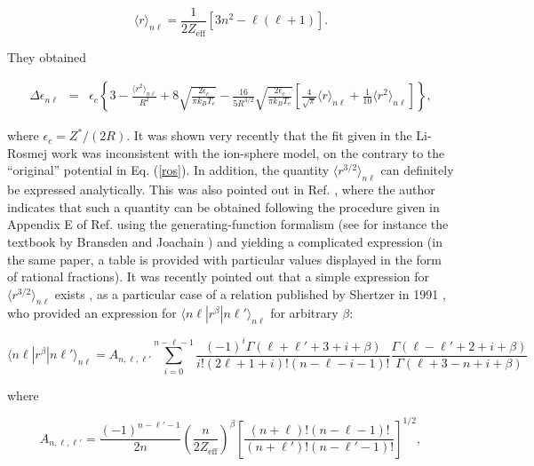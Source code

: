 \documentclass[a4paper,10pt]{article}
\begin{document}
\begin{equation}\label{radius}
\langle r\rangle_{n\ell}=\frac{1}{2Z_{\mathrm{eff}}}\left[3n^2-\ell(\ell+1)\right].
\end{equation}

\noindent They obtained

\begin{eqnarray}\label{appr}
\Delta\epsilon_{n\ell}&=&\epsilon_c\left\{3-\frac{\langle r^2\rangle_{n\ell}}{R^2}+8\sqrt{\frac{2\epsilon_c}{\pi k_BT_e}}-\frac{16}{5R^{3/2}}\sqrt{\frac{2\epsilon_c}{\pi k_BT_e}}\left[\frac{4}{\sqrt{\pi}}\langle r\rangle_{n\ell}+\frac{1}{10}\langle r^2\rangle_{n\ell}\right]\right\},
\end{eqnarray}

\noindent where $\epsilon_c=Z^*/(2R)$. It was shown very recently \cite{IGLESIAS19a} that the fit given in the Li-Rosmej work was inconsistent with the ion-sphere model, on the contrary to the ``original'' potential in Eq. (\ref{ros}). In addition, the quantity $\langle r^{3/2}\rangle_{n\ell}$ can definitely be expressed analytically. This was also pointed out in Ref. \cite{IGLESIAS19a}, where the author indicates that such a quantity can be obtained following the procedure given in Appendix E of Ref. \cite{SZMYTKOWSKI97} using the generating-function formalism (see for instance the textbook by Bransden and Joachain \cite{BRANSDEN93}) and yielding a complicated expression (in the same paper, a table is provided with particular values displayed in the form of rational fractions). It was recently pointed out that a simple expression for $\langle r^{3/2}\rangle_{n\ell}$ exists \cite{PAIN19}, as a particular case of a relation published by Shertzer in 1991 \cite{SHERTZER91}, who provided an expression for $\langle n\ell|r^{\beta}|n\ell'\rangle_{n\ell}$ for arbitrary $\beta$:

\begin{equation}\label{she}
\langle n\ell|r^{\beta}|n\ell'\rangle_{n\ell}=A_{n,\ell,\ell'}\sum_{i=0}^{n-\ell-1}\frac{(-1)^i\Gamma(\ell+\ell'+3+i+\beta)}{i!(2\ell+1+i)!(n-\ell-i-1)!}\frac{\Gamma(\ell-\ell'+2+i+\beta)}{\Gamma(\ell+3-n+i+\beta)}
\end{equation}

where

\begin{equation*}
A_{n,\ell,\ell'}=\frac{(-1)^{n-\ell'-1}}{2n}\left(\frac{n}{2Z_{\mathrm{eff}}}\right)^{\beta}\left[\frac{(n+\ell)!(n-\ell-1)!}{(n+\ell')!(n-\ell'-1)!}\right]^{1/2},
\end{equation*}
\end{document}
